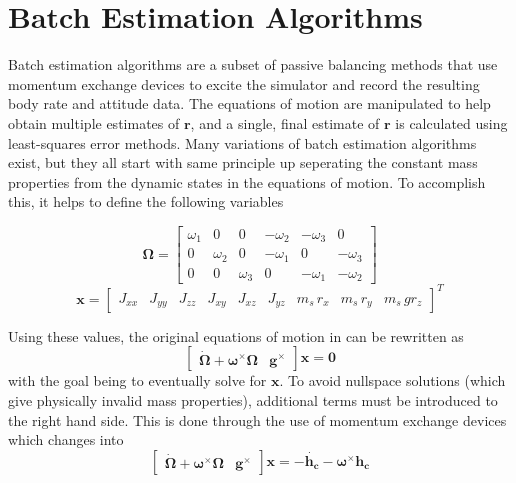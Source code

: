 \section{Batch Estimation Algorithms}

Batch estimation algorithms are a subset of passive balancing methods that use momentum exchange devices to excite the simulator and record the resulting body rate and attitude data. The equations of motion are manipulated to help obtain multiple estimates of $\bm{r}$, and a single, final estimate of $\bm{r}$ is calculated using least-squares error methods. Many variations of batch estimation algorithms exist, but they all start with same principle up seperating the constant mass properties from the dynamic states in the equations of motion. To accomplish this, it helps to define the following variables

\begin{equation}
    \bm{\Omega} =
        \begin{bmatrix}
            \omega_1 & 0 & 0 & -\omega_2 & -\omega_3 & 0 \\
            0 & \omega_2 & 0 & -\omega_1 & 0 & -\omega_3 \\
            0 & 0 & \omega_3 & 0 & -\omega_1 & -\omega_2
        \end{bmatrix}
\end{equation}
\begin{equation}
    \bm{x} = \begin{bmatrix}
        J_{xx} & J_{yy} & J_{zz} & J_{xy} & J_{xz} & J_{yz} & m_s\,r_x & m_s\,r_y & m_s\,gr_z
    \end{bmatrix}^T
\end{equation}

Using these values, the original equations of motion in  can be rewritten as 
\begin{equation}\label{equation:no_MEDs}
    \begin{bmatrix}
        \dot{\bm{\Omega}}+\bm{\omega}^{\times}\bm{\Omega} & \bm{g}^{\times}
    \end{bmatrix}\bm{x}
    =\bm{0}
\end{equation}
with the goal being to eventually solve for $\bm{x}$. To avoid nullspace solutions (which give physically invalid mass properties), additional terms must be introduced to the right hand side. This is done through the use of momentum exchange devices which changes  into 
\begin{equation}\label{equation:with_MEDs}
    \begin{bmatrix}
    \dot{\bm{\Omega}}+\bm{\omega}^{\times}\bm{\Omega} & \bm{g}^{\times}
    \end{bmatrix}\bm{x}
    =-\dot{\bm{h_c}} - \bm{\omega}^{\times}\bm{h_c}
\end{equation}

